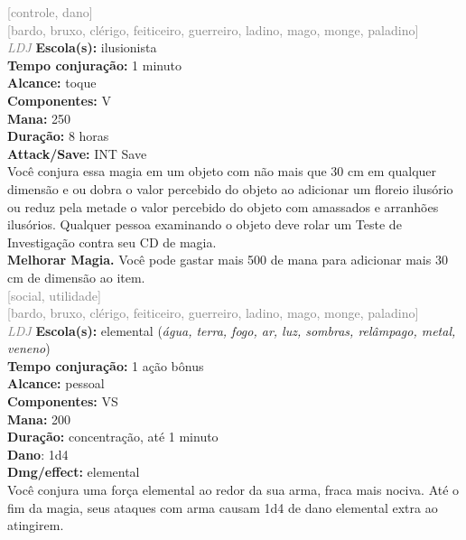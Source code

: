 \documentclass{RPG_Adventure}[2021/10/20]
\begin{document}
{\scriptsize \textcolor{gray}{[controle, dano]\\}}
{\scriptsize \textcolor{gray}{[bardo, bruxo, clérigo, feiticeiro, guerreiro, ladino, mago, monge, paladino]\\}}
{\tiny \textcolor{gray}{\textit{LDJ}}}
{\small \t \textbf{Escola(s):} ilusionista\\\t \textbf{Tempo conjuração:} 1 minuto\\\t \textbf{Alcance:} toque\\\t \textbf{Componentes:} V\\\t \textbf{Mana:} 250\\\t \textbf{Duração:} 8 horas\\\t \textbf{Attack/Save:} INT Save\\}
{\normalsize Você conjura essa magia em um objeto com não mais que 30 cm em qualquer dimensão e ou dobra o valor percebido do objeto ao adicionar um floreio ilusório ou reduz pela metade o valor percebido do objeto com amassados e arranhões ilusórios. Qualquer pessoa examinando o objeto deve rolar um Teste de Investigação contra seu CD de magia.\\\t \textbf{Melhorar Magia.} Você pode gastar mais 500 de mana para adicionar mais 30 cm de dimensão ao item.\\}
{\scriptsize \textcolor{gray}{[social, utilidade]\\}}
{\scriptsize \textcolor{gray}{[bardo, bruxo, clérigo, feiticeiro, guerreiro, ladino, mago, monge, paladino]\\}}
{\tiny \textcolor{gray}{\textit{LDJ}}}
{\small \t \textbf{Escola(s):} elemental (\textit{água, terra, fogo, ar, luz, sombras, relâmpago, metal, veneno})\\\t \textbf{Tempo conjuração:} 1 ação bônus\\\t \textbf{Alcance:} pessoal\\\t \textbf{Componentes:} VS\\\t \textbf{Mana:} 200\\\t \textbf{Duração:} concentração, até 1 minuto\\\t \textbf{Dano}: 1d4\\\t \textbf{Dmg/effect:} elemental\\}
{\normalsize Você conjura uma força elemental ao redor da sua arma, fraca mais nociva. Até o fim da magia, seus ataques com arma causam 1d4 de dano elemental extra ao atingirem.\\}
\end{document}
